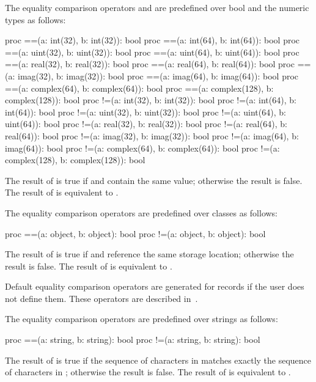 The equality comparison operators \chpl{==} and \chpl{\!=} are predefined over bool and the
numeric types as follows:
\begin{chapel}
proc ==(a: int(32), b: int(32)): bool
proc ==(a: int(64), b: int(64)): bool
proc ==(a: uint(32), b: uint(32)): bool
proc ==(a: uint(64), b: uint(64)): bool
proc ==(a: real(32), b: real(32)): bool
proc ==(a: real(64), b: real(64)): bool
proc ==(a: imag(32), b: imag(32)): bool
proc ==(a: imag(64), b: imag(64)): bool
proc ==(a: complex(64), b: complex(64)): bool
proc ==(a: complex(128), b: complex(128)): bool
proc !=(a: int(32), b: int(32)): bool
proc !=(a: int(64), b: int(64)): bool
proc !=(a: uint(32), b: uint(32)): bool
proc !=(a: uint(64), b: uint(64)): bool
proc !=(a: real(32), b: real(32)): bool
proc !=(a: real(64), b: real(64)): bool
proc !=(a: imag(32), b: imag(32)): bool
proc !=(a: imag(64), b: imag(64)): bool
proc !=(a: complex(64), b: complex(64)): bool
proc !=(a: complex(128), b: complex(128)): bool
\end{chapel}
The result of  is true if  and  contain
the same value; otherwise the result is false.  The result of  is equivalent to .

The equality comparison operators are predefined over classes as
follows:
\begin{chapel}
proc ==(a: object, b: object): bool
proc !=(a: object, b: object): bool
\end{chapel}
The result of  is true if  and  reference
the same storage location; otherwise the result is false.  The result
of  is equivalent to .

Default equality comparison operators are generated for records if the
user does not define them.  These operators are described
in~.

The equality comparison operators are predefined over strings as
follows:
\begin{chapel}
proc ==(a: string, b: string): bool
proc !=(a: string, b: string): bool
\end{chapel}
The result of  is true if the sequence of characters
in  matches exactly the sequence of characters in ;
otherwise the result is false.  The result of  is
equivalent to .

